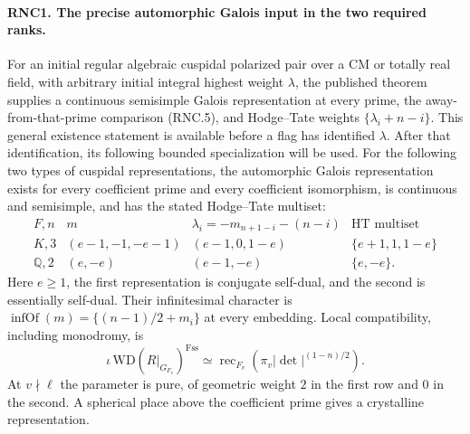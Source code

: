 \paragraph{RNC1. The precise automorphic Galois input in the two required ranks.}
\label{claim:RNC1}
For an initial regular algebraic cuspidal polarized pair over
a CM or totally real field, with arbitrary initial integral
highest weight $\lambda$, the published theorem supplies a
continuous semisimple Galois representation at every prime,
the away-from-that-prime comparison (RNC.5), and Hodge--Tate
weights $\{\lambda_i+n-i\}$.  This general existence statement
is available before a flag has identified $\lambda$.
After that identification, its following bounded
specialization will be used.
For the following two types of cuspidal representations, the
automorphic Galois representation exists for every coefficient
prime and every coefficient isomorphism, is continuous and
semisimple, and has the stated Hodge--Tate multiset:
\[
\begin{array}{c|c|c|c}
 F,n& m&\lambda_i=-m_{n+1-i}-(n-i)&\mathrm{HT}\text{ multiset}\\ \hline
 K,3&(e-1,-1,-e-1)&(e-1,0,1-e)&\{e+1,1,1-e\}\\
 \mathbb Q,2&(e,-e)&(e-1,-e)&\{e,-e\}.
\end{array}                                                     \tag{RNC.4}
\]
Here $e\geq1$, the first representation is conjugate self-dual,
and the second is essentially self-dual.  Their infinitesimal
character is $\operatorname{infOf}(m)=\{(n-1)/2+m_i\}$ at every
embedding.  Local compatibility, including monodromy, is
\[
 \iota\,\mathrm{WD}(R|_{G_{F_v}})^{\mathrm{F\!ss}}
      \simeq\operatorname{rec}_{F_v}
                    (\pi_v|\det|^{(1-n)/2}) .                 \tag{RNC.5}
\]
At $v\nmid\ell$ the parameter is pure, of geometric weight $2$
in the first row and $0$ in the second.  A spherical place above
the coefficient prime gives a crystalline representation.
